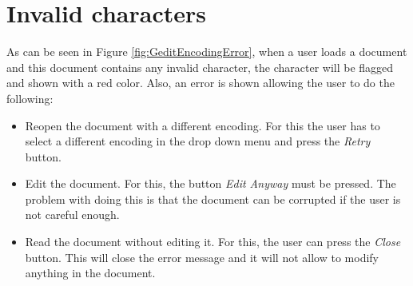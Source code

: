 \chapter{Invalid characters}


As can be seen in Figure \ref{fig:GeditEncodingError}, when a user loads a document and this document 
contains any invalid character, the character will be flagged and shown with a red color. Also, an error is shown allowing the user to do the following:
\begin{itemize}
  \item Reopen the document with a different encoding. For this the user has to select a different encoding in the drop down menu and press the \emph{Retry} button.
  \item Edit the document. For this, the button \emph{Edit Anyway} must be pressed. The problem with doing this is that the document can be corrupted if the user is not careful enough.
  \item Read the document without editing it. For this, the user can press the \emph{Close} button. This will close the error message and it will not allow to modify anything in the document.
\end{itemize}
